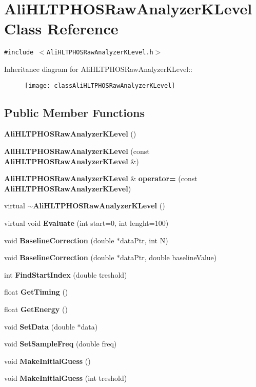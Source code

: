 \section{Ali\-HLTPHOSRaw\-Analyzer\-KLevel Class Reference}
\label{classAliHLTPHOSRawAnalyzerKLevel}
{\tt \#include $<$Ali\-HLTPHOSRaw\-Analyzer\-KLevel.h$>$}

Inheritance diagram for Ali\-HLTPHOSRaw\-Analyzer\-KLevel::\begin{figure}[H]
\begin{center}
\leavevmode
\texttt{[image: classAliHLTPHOSRawAnalyzerKLevel]}
\end{center}
\end{figure}
\subsection*{Public Member Functions}
\begin{CompactItemize}
\item 
{\bf Ali\-HLTPHOSRaw\-Analyzer\-KLevel} ()
\item 
{\bf Ali\-HLTPHOSRaw\-Analyzer\-KLevel} (const {\bf Ali\-HLTPHOSRaw\-Analyzer\-KLevel} \&)
\item 
{\bf Ali\-HLTPHOSRaw\-Analyzer\-KLevel} \& {\bf operator=} (const {\bf Ali\-HLTPHOSRaw\-Analyzer\-KLevel})
\item 
virtual {\bf $\sim$Ali\-HLTPHOSRaw\-Analyzer\-KLevel} ()
\item 
virtual void {\bf Evaluate} (int start=0, int lenght=100)
\item 
void {\bf Baseline\-Correction} (double $\ast$data\-Ptr, int N)
\item 
void {\bf Baseline\-Correction} (double $\ast$data\-Ptr, double baseline\-Value)
\item 
int {\bf Find\-Start\-Index} (double treshold)
\item 
float {\bf Get\-Timing} ()
\item 
float {\bf Get\-Energy} ()
\item 
void {\bf Set\-Data} (double $\ast$data)
\item 
void {\bf Set\-Sample\-Freq} (double freq)
\item 
void {\bf Make\-Initial\-Guess} ()
\item 
void {\bf Make\-Initial\-Guess} (int treshold)
\end{CompactItemize}
